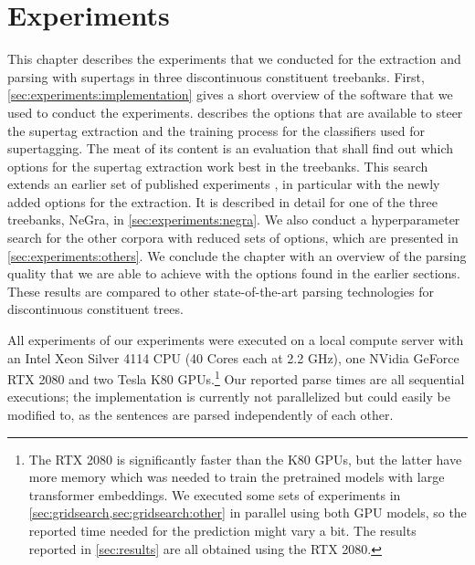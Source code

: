 \documentclass[../document.tex]{subfiles}
\begin{document}
    \chapter{Experiments}
    
    This chapter describes the experiments that we conducted for the extraction and parsing with supertags in three discontinuous constituent treebanks.
    First, \cref{sec:experiments:implementation} gives a short overview of the software that we used to conduct the experiments.
     describes the options that are available to steer the supertag extraction and the training process for the classifiers used for supertagging.
    The meat of its content is an evaluation that shall find out which options for the supertag extraction work best in the treebanks.
    This search extends an earlier set of published experiments \citep{Rup22}, in particular with the newly added options for the extraction.
    It is described in detail for one of the three treebanks, NeGra, in \cref{sec:experiments:negra}.
    We also conduct a hyperparameter search for the other corpora with reduced sets of options, which are presented in \cref{sec:experiments:others}.
    We conclude the chapter with an overview of the parsing quality that we are able to achieve with the options found in the earlier sections.
    These results are compared to other state-of-the-art parsing technologies for discontinuous constituent trees.

    All experiments of our experiments were executed on a local compute server with an Intel Xeon Silver 4114 CPU (40 Cores each at 2.2 GHz), one NVidia GeForce RTX 2080 and two Tesla K80 GPUs.\footnote{
        The RTX 2080 is significantly faster than the K80 GPUs, but the latter have more memory which was needed to train the pretrained models with large transformer embeddings.
        We executed some sets of experiments in \cref{sec:gridsearch,sec:gridsearch:other} in parallel using both GPU models, so the reported time needed for the prediction might vary a bit.
        The results reported in \cref{sec:results} are all obtained using the RTX 2080. 
    }
    Our reported parse times are all sequential executions; the implementation is currently not parallelized but could easily be modified to, as the sentences are parsed independently of each other.
    
    
    
    
    
    

    \ifSubfilesClassLoaded{%
        \printindex
    }{}
\end{document}
